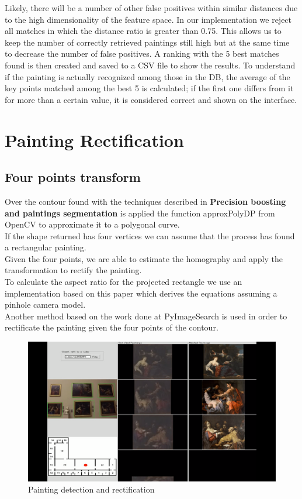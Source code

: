\documentclass[conference]{IEEEtran}
\begin{document}
Likely, there will be a number of other false positives within similar distances due to the high dimensionality of the feature space.
In our implementation we reject all matches in which the distance ratio is greater than 0.75.
This allows us to keep the number of correctly retrieved paintings still high but at the same time to decrease the number of false positives.
A ranking with the 5 best matches found is then created and saved to a CSV file to show the results.
To understand if the painting is actually recognized among those in the DB, the average of the key points matched among the best 5 is calculated; if the first one differs from it for more than a certain value, it is considered correct and shown on the interface.\\


\section{Painting Rectification}
\subsection{Four points transform}
Over the contour found with the techniques described in \textbf{Precision boosting and paintings segmentation} is applied the function approxPolyDP from OpenCV to approximate it to a polygonal curve.\\
If the shape returned has four vertices we can assume that the process has found a rectangular painting.\\
Given the four points, we are able to estimate the homography and apply the transformation to rectify the painting.\\
To calculate the aspect ratio for the projected rectangle we use an implementation based on this paper \cite{b10} which derives the equations assuming a pinhole camera model.\\
Another method based on the work done at PyImageSearch\cite{b13} is used in order to rectificate the painting given the four points of the contour.

\begin{figure}[htbp]
\centerline{\includegraphics[width=0.8\columnwidth]{../detection_and_rectification/top_association_vid05.png}}
\caption{Painting detection and rectification}
\label{fig_Painting_detection_and_rectification}
\end{figure}
\end{document}
